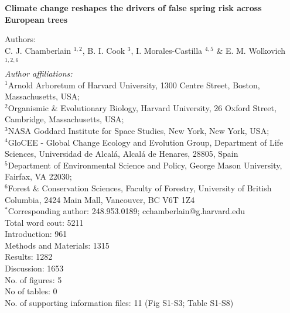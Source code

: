 \documentclass{article}\usepackage[]{graphicx}\usepackage[]{color}
\begin{document}
\noindent 
\textbf{\LARGE{Climate change reshapes the drivers of false spring risk across European trees}} 


\noindent Authors:\\
C. J. Chamberlain $^{1,2}$, B. I. Cook $^{3}$, I. Morales-Castilla $^{4,5}$ \& E. M. Wolkovich $^{1,2,6}$
\vspace{2ex}\\
\emph{Author affiliations:}\\
$^{1}$Arnold Arboretum of Harvard University, 1300 Centre Street, Boston, Massachusetts, USA; \\
$^{2}$Organismic \& Evolutionary Biology, Harvard University, 26 Oxford Street, Cambridge, Massachusetts, USA; \\
$^{3}$NASA Goddard Institute for Space Studies, New York, New York, USA; \\
$^{4}$GloCEE - Global Change Ecology and Evolution Group, Department of Life Sciences, Universidad de Alcal\'{a}, Alcal\'{a} de Henares, 28805, Spain \\
$^{5}$Department of Environmental Science and Policy, George Mason University, Fairfax, VA 22030; \\
$^{6}$Forest \& Conservation Sciences, Faculty of Forestry, University of British Columbia, 2424 Main Mall, Vancouver, BC V6T 1Z4\\
\vspace{2ex}
$^*$Corresponding author: 248.953.0189; cchamberlain@g.harvard.edu\\

Total word cout: 5211 \\
Introduction: 961 \\
Methods and Materials: 1315\\
Results: 1282\\
Discussion: 1653 \\

No. of figures: 5\\
No of tables: 0 \\
No. of supporting information files: 11 (Fig S1-S3; Table S1-S8)\\ 
\end{document}
